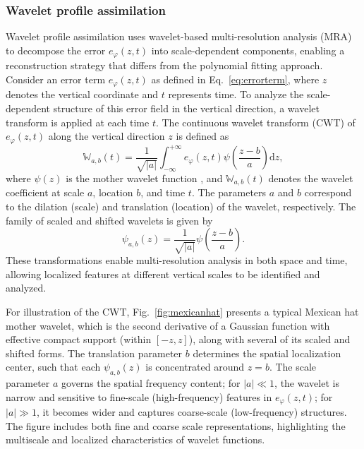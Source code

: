 \subsubsection{Wavelet profile assimilation}
\label{subsub:wpa}
Wavelet profile assimilation uses wavelet-based multi-resolution analysis (MRA) \citep{mallat1989theory,debnath2017construction} to decompose the error \( e_\varphi(z,t) \) into scale-dependent components, enabling a reconstruction strategy that differs from the polynomial fitting approach. Consider an error term \( e_{\varphi}(z,t) \) as defined in Eq.~\ref{eq:errorterm}, where \( z \) denotes the vertical coordinate and \( t \) represents time. To analyze the scale-dependent structure of this error field in the vertical direction, a wavelet transform is applied at each time \( t \). The continuous wavelet transform (CWT) of \( e_{\varphi}(z,t) \) along the vertical direction \( z \) is defined as
\begin{equation}
\mathbb{W}_{a,b}(t) = \frac{1}{\sqrt{|a|}} \int_{-\infty}^{+\infty} e_{\varphi}(z,t) \psi \left( \frac{z - b}{a} \right) \mathrm{d}z,
\label{eq:wt}
\end{equation}
where \( \psi(z) \) is the mother wavelet function \citep{mallat1999wavelet}, and \( \mathbb{W}_{a,b}(t) \) denotes the wavelet coefficient at scale \( a \), location \( b \), and time \( t \). The parameters \( a \) and \( b \) correspond to the dilation (scale) and translation (location) of the wavelet, respectively. The family of scaled and shifted wavelets is given by
\begin{equation}
\psi_{a,b}(z) = \frac{1}{\sqrt{|a|}} \psi\left( \frac{z - b}{a} \right).
\end{equation}
These transformations enable multi-resolution analysis in both space and time, allowing localized features at different vertical scales to be identified and analyzed.

For illustration of the CWT, Fig.~\ref{fig:mexicanhat} presents a typical Mexican hat mother wavelet, which is the second derivative of a Gaussian function with effective compact support (within \([-z, z]\)), along with several of its scaled and shifted forms. The translation parameter \( b \) determines the spatial localization center, such that each \( \psi_{a,b}(z) \) is concentrated around \( z = b \). The scale parameter \( a \) governs the spatial frequency content; for \( |a| \ll 1 \), the wavelet is narrow and sensitive to fine-scale (high-frequency) features in \( e_{\varphi}(z,t) \); for \( |a| \gg 1 \), it becomes wider and captures coarse-scale (low-frequency) structures. The figure includes both fine and coarse scale representations, highlighting the multiscale and localized characteristics of wavelet functions.


